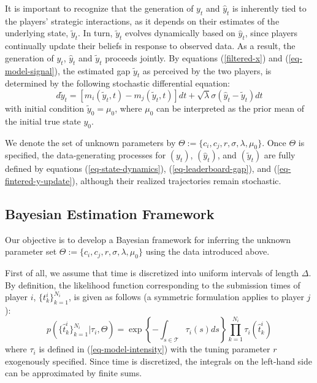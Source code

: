 \documentclass[mnsc]{informs3}
\begin{document}
It is important to recognize that the generation of $y_t$ and $\hat{y}_t$ is inherently tied to the players’ strategic interactions, as it depends on their estimates of the underlying state, $\tilde{y}_t$. 
In turn, $\tilde{y}_t$ evolves dynamically based on $\hat{y}_t$, since players continually update their beliefs in response to observed data. 
As a result, the generation of $y_t$, $\hat{y}_t$ and $\tilde{y}_t$ proceeds jointly.
By equations (\ref{filtered-x}) and (\ref{eq-model-signal}), the estimated gap $\tilde{y}_t$ as perceived by the two players, is determined by the following stochastic differential equation:
\begin{equation}\label{eq-fintered-y-update}
d\tilde{y}_{t} = \left[m_i(\tilde{y}_t, t) - m_j(\tilde{y}_t, t)\right]dt + \sqrt{\lambda}\sigma(\hat{y}_t-\tilde{y}_{t}) dt
\end{equation}
with initial condition $\tilde{y}_0 = \mu_0$, where $\mu_0$ can be interpreted as the prior mean of the initial true state $y_0$.

We denote the set of unknown parameters by $\Theta := \{c_i, c_j, r, \sigma, \lambda, \mu_0\}$.
Once $\Theta$ is specified, the data-generating processes for $(y_t)$, $(\hat{y}_t)$, and $(\tilde{y}_t)$ are fully defined by equations (\ref{eq-state-dynamics}), (\ref{eq-leaderboard-gap}), and (\ref{eq-fintered-y-update}), although their realized trajectories remain stochastic.


\subsection{Bayesian Estimation Framework}

Our objective is to develop a Bayesian framework for inferring the unknown parameter set $\Theta := \{ c_i, c_j, r, \sigma, \lambda, \mu_0 \}$ using the data introduced above.

First of all, we assume that time is discretized into uniform intervals of length $\Delta$.
By definition, the likelihood function corresponding to the submission times of player $i$, $\{t^i_k\}_{k=1}^{N_i}$, is given as follows (a symmetric formulation applies to player $j$):
\begin{equation}\label{eq-ihpp-prob}
p\left(\{\hat{t}^i_k\}_{k=1}^{N_i} | \tau_i, \Theta\right) = \exp\left\{-\int_{s\in\mathcal{T}}\tau_i(s)ds\right\}\prod_{k=1}^{N_i}\tau_i(\hat{t}^i_k)
\end{equation}
where $\tau_i$ is defined in (\ref{eq-model-intensity}) with the tuning parameter $r$ exogenously specified. 
Since time is discretized, the integrals on the left-hand side can be approximated by finite sums.
\end{document}
